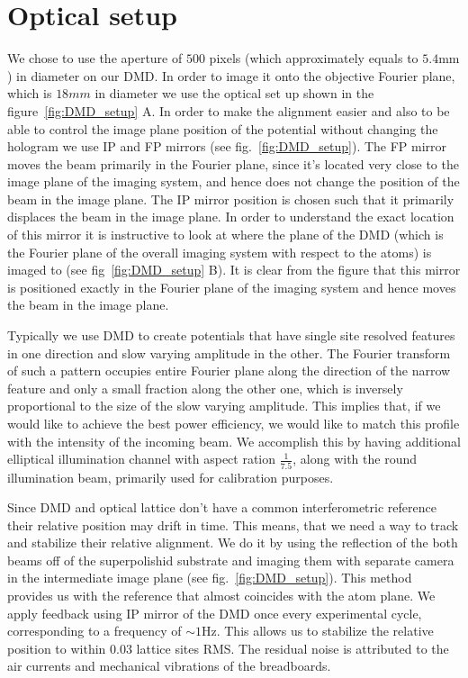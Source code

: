 \section{Optical setup}
We chose to use the aperture of $500$ pixels (which approximately equals to $5.4 \mathrm{mm}$) in diameter on our DMD. In order to image it onto the objective Fourier plane, which is $18 mm$ in diameter we use the optical set up shown in the figure~\ref{fig:DMD_setup} A. In order to make the alignment easier and also to be able to control the image plane position of the potential without changing the hologram we use IP and FP mirrors (see fig.~\ref{fig:DMD_setup}). The FP mirror moves the beam primarily in the Fourier plane, since it's located very close to the image plane of the imaging system, and hence does not change the position of the beam in the image plane. The IP mirror position is chosen such that it primarily displaces the beam in the image plane. In order to understand the exact location of this mirror it is instructive to look at where the plane of the DMD (which is the Fourier plane of the overall imaging system with respect to the atoms) is imaged to (see fig~\ref{fig:DMD_setup} B). It is clear from the figure that this mirror is positioned exactly in the Fourier plane of the imaging system and hence moves the beam in the image plane.

Typically we use DMD to create potentials that have single site resolved features in one direction and slow varying amplitude in the other. The Fourier transform of such a pattern occupies entire Fourier plane along the direction of the narrow feature and only a small fraction along the other one, which is inversely proportional to the size of the slow varying amplitude. This implies that, if we would like to achieve the best power efficiency, we would like to match this profile with the intensity of the incoming beam. We accomplish this by having additional elliptical illumination channel with aspect ration $\frac{1}{7.5}$, along with the round illumination beam, primarily used for calibration purposes.

Since DMD and optical lattice don't have a common interferometric reference their relative position may drift in time. This means, that we need a way to track and stabilize their relative alignment. We do it by using the reflection of the both beams off of the superpolishid substrate and imaging them with separate camera in the intermediate image plane (see fig.~\ref{fig:DMD_setup}). This method provides us with the reference that almost coincides with the atom plane. We apply feedback using IP mirror of the DMD once every experimental cycle, corresponding to a frequency of $\sim 1 \mathrm{Hz}$. This allows us to stabilize the relative position to within $0.03$ lattice sites RMS. The residual noise is attributed to the air currents and mechanical vibrations of the breadboards.

